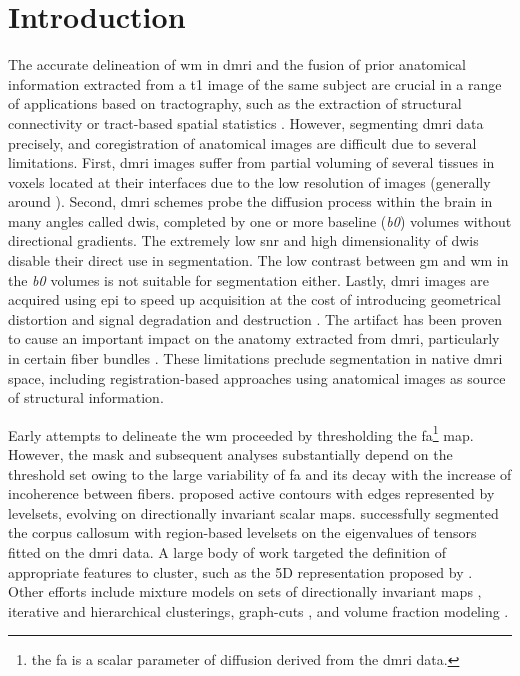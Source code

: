 \section{Introduction}\label{sec:introduction}
The accurate delineation of \gls*{wm} in \gls*{dmri} and the fusion of prior
  anatomical information extracted from a \gls*{t1} image of the same subject
  are crucial in a range of applications based on tractography, such as
  the extraction of structural connectivity \citep{craddock_imaging_2013} or
  tract-based spatial statistics \citep{smith_tractbased_2006}.
However, segmenting \gls*{dmri} data precisely, and coregistration of anatomical
  images are difficult due to several limitations.
First, \gls{dmri} images suffer from partial voluming of several tissues in 
  voxels located at their interfaces due to the low resolution of images
  (generally around ).
Second, \gls*{dmri} schemes probe the diffusion process within the brain in 
  many angles called \glspl*{dwi}, completed by one or more baseline (\emph{b0}) 
  volumes without directional gradients.
The extremely low \gls*{snr} and high dimensionality of \glspl*{dwi} disable their
  direct use in segmentation.
The low contrast between \gls*{gm} and \gls*{wm} in the \emph{b0} volumes is not suitable for 
  segmentation either.
Lastly, \gls*{dmri} images are acquired using \gls*{epi} to speed up acquisition
  at the cost of introducing geometrical distortion and signal degradation and
  destruction \citep{jezzard_correction_1995}.
The artifact has been proven to cause an important impact on the anatomy extracted
  from \gls*{dmri}, particularly in certain fiber bundles \citep{irfanoglu_effects_2012}.
These limitations preclude segmentation in native \gls*{dmri} space, including
  registration-based approaches using anatomical images as source of structural
  information.


Early attempts to delineate the \gls*{wm} proceeded by thresholding the 
  \gls*{fa}\footnote{the \gls*{fa} is a scalar parameter of diffusion derived from
  the \gls*{dmri} data.} map.
However, the mask and subsequent analyses substantially depend on the threshold set
  \citep{taoka_fractional_2009} owing to the large variability of \gls*{fa} and its
  decay with the increase of incoherence between fibers.
\cite{zhukov_level_2003} proposed active contours with edges represented
  by levelsets, evolving on directionally invariant scalar maps.
\cite{rousson_level_2004} successfully segmented the corpus callosum with
  region-based levelsets on the eigenvalues of tensors fitted on the
  \gls*{dmri} data.
A large body of work targeted the definition of appropriate features to cluster,
  such as the 5D representation proposed by \cite{jonasson_segmentation_2005}.
Other efforts include mixture models on sets of directionally invariant maps
  \citep{liu_brain_2007}, iterative \citep{hadjiprocopis_unbiased_2005} and
  hierarchical \citep{lu_segmentation_2008} clusterings,
  graph-cuts \citep{han_experimental_2009},
  and volume fraction modeling \citep{kumazawa_improvement_2013}.
 
